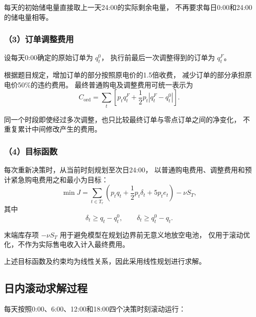 每天的初始储电量直接取上一天24:00的实际剩余电量，
不再要求每日0:00和24:00的储电量相等。


\subsubsection*{（3）订单调整费用}

设每天0:00确定的原始订单为 $q_t^0$，
执行前最后一次调整得到的订单为 $q_t^F$。

根据题目规定，增加订单的部分按照原电价的1.5倍收费，
减少订单的部分承担原电价50\%的违约费用。
最终普通购电及调整费用可统一表示为
\begin{equation}
C_{\mathrm{ord}}
=
\sum_t
\left[
p_tq_t^F
+
\frac{1}{2}p_t
\left|
q_t^F-q_t^0
\right|
\right].
\end{equation}

同一个时段即使经过多次调整，也只比较最终订单与零点订单之间的净变化，
不重复累计中间修改产生的费用。


\subsubsection*{（4）目标函数}

每次重新决策时，从当前时刻规划至次日24:00，
以普通购电费用、调整费用和预计紧急购电费用之和最小为目标：
\begin{equation}
\min J
=
\sum_{t\in T_r}
\left(
p_tq_t
+
\frac{1}{2}p_t\delta_t
+
5p_te_t
\right)
-\nu S_T,
\end{equation}
其中
\begin{equation}
\delta_t\geq q_t-q_t^0,
\qquad
\delta_t\geq q_t^0-q_t.
\end{equation}

末端库存项 $-\nu S_T$ 用于避免模型在规划边界前无意义地放空电池，
仅用于滚动优化，不作为实际售电收入计入最终费用。

上述目标函数及约束均为线性关系，因此采用线性规划进行求解。


\subsection{日内滚动求解过程}

每天按照0:00、6:00、12:00和18:00四个决策时刻滚动运行：

